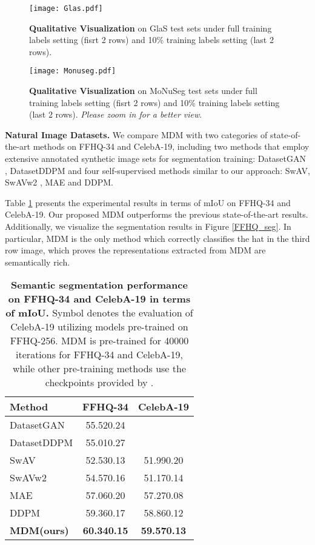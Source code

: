 \documentclass{article} \usepackage{iclr2024_conference,times}
\begin{document}
\begin{figure*}[!ht]
\centering
\texttt{[image: Glas.pdf]} \caption{\textbf{Qualitative Visualization} on GlaS test sets under full training labels setting (fisrt 2 rows) and 10\% training labels setting (last 2 rows).}
\label{Glas_seg}
\end{figure*}



\begin{figure*}[!ht]
\centering
\texttt{[image: Monuseg.pdf]} \caption{\textbf{Qualitative Visualization} on MoNuSeg test sets under full training labels setting (fisrt 2 rows) and 10\% training labels setting (last 2 rows). \textit{Please zoom in for a better view}.}
\label{Monuseg_seg}
\end{figure*}


\textbf{Natural Image Datasets.} We compare MDM with two categories of state-of-the-art methods on FFHQ-34 and CelebA-19, including two methods that employ extensive annotated synthetic image sets for segmentation training: DatasetGAN \citep{DBLP:conf/cvpr/ZhangLGYLB0F21}, DatasetDDPM \citep{DBLP:conf/iclr/BaranchukVRKB22} and four self-supervised methods similar to our approach: 
SwAV, SwAVw2 \citep{DBLP:conf/nips/CaronMMGBJ20}, MAE and DDPM.

Table \ref{FFHQ_and_CelebA} presents the experimental results in terms of mIoU on FFHQ-34 and CelebA-19. Our proposed MDM outperforms the previous state-of-the-art results. Additionally, we visualize the segmentation results in Figure \ref{FFHQ_seg}. 
In particular, MDM is the only method which correctly classifies the hat in the third row image, which proves the representations extracted from MDM are semantically rich.
\begin{table}[!htp]
    \centering
    \caption{\textbf{Semantic segmentation performance on FFHQ-34 and CelebA-19 in terms of mIoU.} Symbol  denotes the evaluation of CelebA-19 utilizing models pre-trained on FFHQ-256. MDM is pre-trained for 40000 iterations for FFHQ-34 and CelebA-19, while other pre-training methods use the checkpoints provided by \citet{DBLP:conf/iclr/BaranchukVRKB22}.}
    \small \begin{tabular}{lcc}
        \toprule
         Method &FFHQ-34 &CelebA-19\\
        \midrule
        DatasetGAN &55.520.24 &\text{-}\\
        DatasetDDPM &55.010.27 &\text{-}\\
        \midrule
        SwAV  &52.530.13 &51.990.20\\
        SwAVw2 &54.570.16 &51.170.14\\
        \midrule
        MAE        &57.060.20 &57.270.08\\
        DDPM       &59.360.17 &58.860.12 \\
\textbf{MDM(ours)} &\textbf{60.340.15}  &\textbf{59.570.13} \\
        \bottomrule
    \end{tabular}
    \label{FFHQ_and_CelebA}
\end{table}
\end{document}
